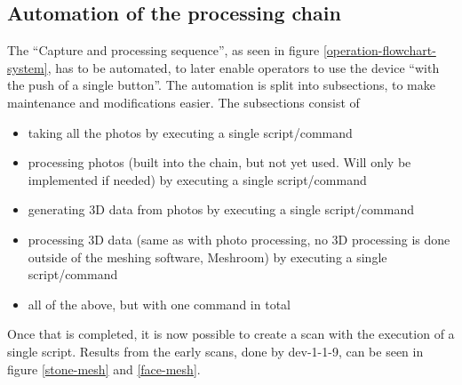 \subsection{Automation of the processing chain}
	The \enquote{Capture and processing sequence}, as seen in figure \ref{operation-flowchart-system}, has to be automated, to later enable operators to use the device \enquote{with the push of a single button}. The automation is split into subsections, to make maintenance and modifications easier. The subsections consist of
	\begin{itemize}
		\item taking all the photos by executing a single script/command
		\item processing photos (built into the chain, but not yet used. Will only be implemented if needed) by executing a single script/command
		\item generating 3D data from photos by executing a single script/command
		\item processing 3D data (same as with photo processing, no 3D processing is done outside of the meshing software, Meshroom) by executing a single script/command
		\item all of the above, but with one command in total
	\end{itemize}
	
	Once that is completed, it is now possible to create a scan with the execution of a single script. Results from the early scans, done by dev-1-1-9, can be seen in figure \ref{stone-mesh} and \ref{face-mesh}.
	
